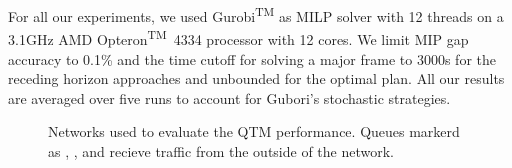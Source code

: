 For all our experiments, we used Gurobi\textsuperscript{TM} as MILP solver with
12 threads on a 3.1GHz AMD Opteron\textsuperscript{TM}~4334 processor with 12
cores.
%
We limit MIP gap accuracy to 0.1\% and the time cutoff for solving a major frame
to 3000s for the receding horizon approaches and unbounded for the optimal plan.
%
%
All our results are averaged over five runs to account for Gubori's
stochastic strategies.




\begin{figure*}[t!]
\centering
\caption{Networks used to evaluate the QTM performance. Queues markerd as
\qLowTraf, \qHighTraf, and \qVarTraf recieve traffic from the outside of the
network.}
\label{fig:networks}
\end{figure*}






